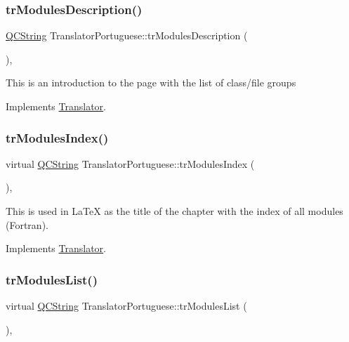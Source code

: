 \subsubsection{\texorpdfstring{trModulesDescription()}{trModulesDescription()}}
{\footnotesize\ttfamily \mbox{\hyperlink{class_q_c_string}{Q\+C\+String}} Translator\+Portuguese\+::tr\+Modules\+Description (\begin{DoxyParamCaption}{ }\end{DoxyParamCaption})\hspace{0.3cm}{\ttfamily [inline]}, {\ttfamily [virtual]}}

This is an introduction to the page with the list of class/file groups 

Implements \mbox{\hyperlink{class_translator}{Translator}}.

\mbox{\label{class_translator_portuguese_aa3ab8ee3c53ccb853010f877aff3f996}} 
\subsubsection{\texorpdfstring{trModulesIndex()}{trModulesIndex()}}
{\footnotesize\ttfamily virtual \mbox{\hyperlink{class_q_c_string}{Q\+C\+String}} Translator\+Portuguese\+::tr\+Modules\+Index (\begin{DoxyParamCaption}{ }\end{DoxyParamCaption})\hspace{0.3cm}{\ttfamily [inline]}, {\ttfamily [virtual]}}

This is used in La\+TeX as the title of the chapter with the index of all modules (Fortran). 

Implements \mbox{\hyperlink{class_translator}{Translator}}.

\mbox{\label{class_translator_portuguese_af40f9186ffc3ad503109004b16de9102}} 
\subsubsection{\texorpdfstring{trModulesList()}{trModulesList()}}
{\footnotesize\ttfamily virtual \mbox{\hyperlink{class_q_c_string}{Q\+C\+String}} Translator\+Portuguese\+::tr\+Modules\+List (\begin{DoxyParamCaption}{ }\end{DoxyParamCaption})\hspace{0.3cm}{\ttfamily [inline]}, {\ttfamily [virtual]}}

